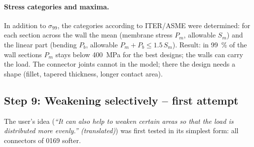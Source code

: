 \paragraph{Stress categories and maxima.} In addition to $\sigma_{99}$, the categories according to ITER/ASME were
determined: for each section across the wall the mean (membrane stress $P_m$, allowable $S_m$) and the linear part
(bending $P_b$, allowable $P_m+P_b\le1.5\,S_m$).
Result: in 99~\% of the wall sections $P_m$ stays below \SI{400}{MPa} for the best designs; the walls can carry the
load. The connector joints cannot in the model; there the design needs a shape (fillet, tapered thickness, longer
contact area).

\subsection*{Step 9: Weakening selectively -- first attempt}
The user's idea (\emph{“It can also help to weaken certain areas so that the load is distributed more evenly.”
(translated)}) was first tested in its simplest form: all connectors of 0169 softer.
\begin{table}[H]\centering\scriptsize\caption{0169 with softer
connectors; numbers 1xx standard mesh, 2xx fine mesh (original: \SI{183}{GPa}).}\end{table}


